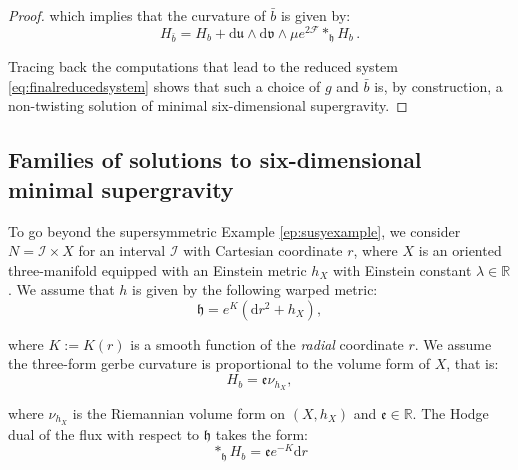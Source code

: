 \documentclass[10pt,a4paper,twoside,reqno]{amsart}
\theoremstyle{plain}
\theoremstyle{definition}
\theoremstyle{remark}
\def\R{\mathbb{R}}
\def\dd{\mathrm{d}}
\def\cI{\mathcal{I}}
\def\cF{\mathcal{F}}
\def\R{\mathbb{R}}
\def\dd{\mathrm{d}}
\def\fru{\mathfrak{u}}
\def\frv{\mathfrak{v}}
\begin{document}
\begin{proof}
\noindent
which implies that the curvature of $\bar{b}$ is given by:
\begin{equation*}
H_{\bar{b}} = H_b + \dd\fru \wedge \dd\frv \wedge \mu e^{2\cF} \ast_{\mathfrak{h}} H_b\, .
\end{equation*}

\noindent
Tracing back the computations that lead to the reduced system \eqref{eq:finalreducedsystem} shows that such a choice of $g$ and $\bar{b}$ is, by construction, a non-twisting solution of minimal six-dimensional supergravity.
\end{proof}


\subsection{Families of solutions to six-dimensional minimal supergravity}
\label{eq:familiessolutions}


To go beyond the supersymmetric Example \ref{ep:susyexample}, we consider $N = \cI\times X$ for an interval $\cI$ with Cartesian coordinate $r$, where $X$ is an oriented three-manifold equipped with an Einstein metric $h_X$ with Einstein constant $\lambda\in\R$. We assume that $h$ is given by the following warped metric:
\begin{equation*}
\mathfrak{h} =  e^{K}(\dd r^2 +  h_X),
\end{equation*}

\noindent
where $K := K(r)$ is a smooth function of the \emph{radial} coordinate $r$. We assume the three-form gerbe curvature is proportional to the volume form of $X$, that is:
\begin{equation*}
H_b = \mathfrak{e} \nu_{h_X},
\end{equation*}

\noindent
where $\nu_{h_X}$ is the Riemannian volume form on $(X,h_X)$ and $\mathfrak{e}\in\R$. The Hodge dual of the flux with respect to $\mathfrak{h}$ takes the form:
\begin{equation*}
\ast_{\mathfrak{h}} H_b = \mathfrak{e} e^{-K} \dd r   
\end{equation*}
\end{document}
